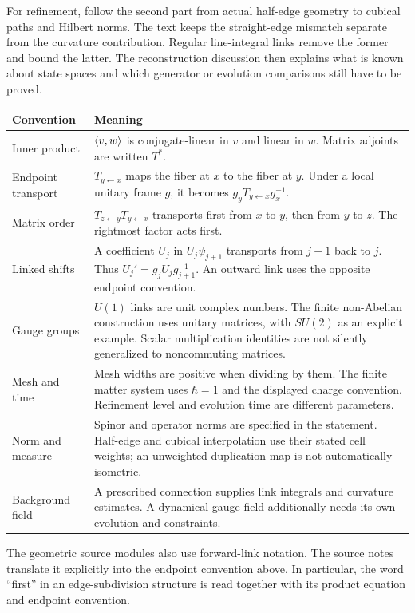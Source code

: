 For refinement, follow the second part from actual half-edge geometry to cubical paths and Hilbert norms. The text keeps the straight-edge mismatch separate from the curvature contribution. Regular line-integral links remove the former and bound the latter. The reconstruction discussion then explains what is known about state spaces and which generator or evolution comparisons still have to be proved.

\begin{longtable}{@{}L{.24\linewidth}L{.67\linewidth}@{}}
\toprule
Convention & Meaning\\\midrule\endhead
Inner product & $\left\langle v,w\right\rangle$ is conjugate-linear in $v$ and linear in $w$. Matrix adjoints are written $T^*$.\\
Endpoint transport & $T_{y\leftarrow x}$ maps the fiber at $x$ to the fiber at $y$. Under a local unitary frame $g$, it becomes $g_yT_{y\leftarrow x}g_x^{-1}$.\\
Matrix order & $T_{z\leftarrow y}T_{y\leftarrow x}$ transports first from $x$ to $y$, then from $y$ to $z$. The rightmost factor acts first.\\
Linked shifts & A coefficient $U_j$ in $U_j\psi_{j+1}$ transports from $j+1$ back to $j$. Thus $U_j'=g_jU_jg_{j+1}^{-1}$. An outward link uses the opposite endpoint convention.\\
Gauge groups & $U(1)$ links are unit complex numbers. The finite non-Abelian construction uses unitary matrices, with $SU(2)$ as an explicit example. Scalar multiplication identities are not silently generalized to noncommuting matrices.\\
Mesh and time & Mesh widths are positive when dividing by them. The finite matter system uses $\hbar=1$ and the displayed charge convention. Refinement level and evolution time are different parameters.\\
Norm and measure & Spinor and operator norms are specified in the statement. Half-edge and cubical interpolation use their stated cell weights; an unweighted duplication map is not automatically isometric.\\
Background field & A prescribed connection supplies link integrals and curvature estimates. A dynamical gauge field additionally needs its own evolution and constraints.\\
\bottomrule
\end{longtable}

The geometric source modules also use forward-link notation. The source notes translate it explicitly into the endpoint convention above. In particular, the word ``first'' in an edge-subdivision structure is read together with its product equation and endpoint convention.

\clearpage
